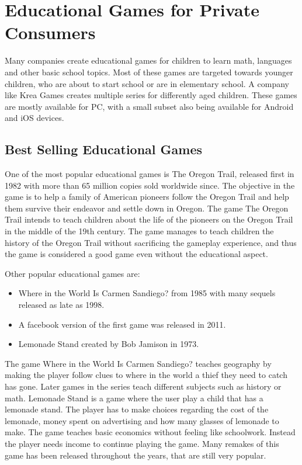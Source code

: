 \section{Educational Games for Private Consumers}
\label{sec:privateconsumers}
Many companies create educational games for children to learn math, languages and other basic school topics.
Most of these games are targeted towards younger children, who are about to start school or are in elementary school.
A company like Krea Games \cite{kreagames} creates multiple series for differently aged children.
These games are mostly available for PC, with a small subset also being available for Android and iOS devices.

\subsection{Best Selling Educational Games}
One of the most popular educational games is The Oregon Trail, released first in 1982 with more than 65 million copies sold worldwide since.\cite{oregontrail}
The objective in the game is to help a family of American pioneers follow the Oregon Trail and help them survive their endeavor and settle down in Oregon.
The game The Oregon Trail intends to teach children about the life of the pioneers on the Oregon Trail in the middle of the 19th century.
The game manages to teach children the history of the Oregon Trail without sacrificing the gameplay experience, and thus the game is considered a good game even without the educational aspect.\newline

Other popular educational games are:
\begin{itemize}
	\item Where in the World Is Carmen Sandiego? from 1985 with many sequels released as late as 1998.\cite{carmensandiego}
	\item A facebook version of the first game was released in 2011.
	\item Lemonade Stand created by Bob Jamison in 1973.\cite{lemonadestand}
\end{itemize}

The game Where in the World Is Carmen Sandiego? teaches geography by making the player follow clues to where in the world a thief they need to catch has gone.
Later games in the series teach different subjects such as history or math.
Lemonade Stand is a game where the user play a child that has a lemonade stand.
The player has to make choices regarding the cost of the lemonade, money spent on advertising and how many glasses of lemonade to make.
The game teaches basic economics without feeling like schoolwork. Instead the player needs income to continue playing the game.
Many remakes of this game has been released throughout the years, that are still very popular.

